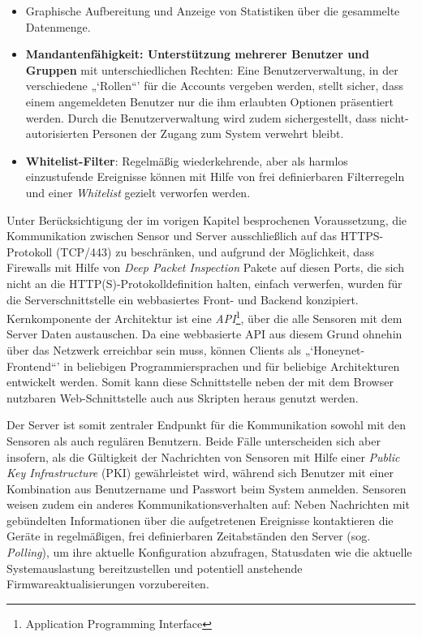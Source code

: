 \documentclass[12pt]{article}
\begin{document}
\begin{itemize}
				\item Graphische Aufbereitung und Anzeige von Statistiken über die gesammelte Datenmenge.
				\item \textbf{Mandantenfähigkeit: Unterstützung mehrerer Benutzer und Gruppen} mit unterschiedlichen Rechten: Eine Benutzerverwaltung, in der verschiedene „`Rollen“' für die Accounts vergeben werden, stellt sicher, dass einem angemeldeten Benutzer nur die ihm erlaubten Optionen präsentiert werden. Durch die Benutzerverwaltung wird zudem sichergestellt, dass nicht-autorisierten Personen der Zugang zum System verwehrt bleibt.
				\item \textbf{Whitelist-Filter}: Regelmäßig wiederkehrende, aber als harmlos einzustufende Ereignisse können mit Hilfe von frei definierbaren Filterregeln und einer \textit{Whitelist} gezielt verworfen werden.
\end{itemize}

Unter Berücksichtigung der im vorigen Kapitel besprochenen Voraussetzung, die Kommunikation zwischen Sensor und Server ausschließlich auf das HTTPS-Protokoll (TCP/443) zu beschränken, und aufgrund der Möglichkeit, dass Firewalls mit Hilfe von \textit{Deep Packet Inspection} Pakete auf diesen Ports, die sich nicht an die HTTP(S)-Protokolldefinition halten, einfach verwerfen, wurden für die Serverschnittstelle ein webbasiertes Front- und Backend konzipiert. Kernkomponente der Architektur ist eine \textit{API}\footnote{Application Programming Interface}, über die alle Sensoren mit dem Server Daten austauschen. Da eine webbasierte API aus diesem Grund ohnehin über das Netzwerk erreichbar sein muss, können Clients als „`Honeynet-Frontend“' in beliebigen Programmiersprachen und für beliebige Architekturen entwickelt werden. Somit kann diese Schnittstelle neben der mit dem Browser nutzbaren Web-Schnittstelle auch aus Skripten heraus genutzt werden.

Der Server ist somit zentraler Endpunkt für die Kommunikation sowohl mit den Sensoren als auch regulären Benutzern. Beide Fälle unterscheiden sich aber insofern, als die Gültigkeit der Nachrichten von Sensoren mit Hilfe einer \textit{Public Key Infrastructure} (PKI) gewährleistet wird, während sich Benutzer mit einer Kombination aus Benutzername und Passwort beim System anmelden. Sensoren weisen zudem ein anderes Kommunikationsverhalten auf: Neben Nachrichten mit gebündelten Informationen über die aufgetretenen Ereignisse kontaktieren die Geräte in regelmäßigen, frei definierbaren Zeitabständen den Server (sog. \textit{Polling}), um ihre aktuelle Konfiguration abzufragen, Statusdaten wie die aktuelle Systemauslastung bereitzustellen und potentiell anstehende Firmwareaktualisierungen vorzubereiten.
\end{document}
